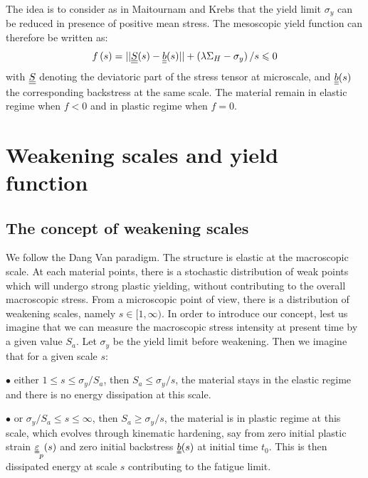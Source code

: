 The idea is to consider as in Maitournam and Krebs\cite{Maitournam2011232} that the yield limit $\sigma_y$ can be reduced in presence of positive mean stress. The mesoscopic yield function can therefore be written as:
\begin{equation}
f\left(s\right)=||\uline{\uline{S}}(s)-\uline{\uline{b}}(s)||+\left( \lambda \Sigma_H-\sigma_y\right) /s\leqslant 0
\label{yieldfun}
\end{equation}
with $\uline{\uline{S}}$ denoting the deviatoric part of the stress tensor at microscale, and $\uline{\uline{b}}(s)$ the corresponding backstress at the same scale. The material remain in elastic regime when $f<0$ and in plastic regime when $f=0$.


\section{Weakening scales and yield function}
\label{sec:5.4}
\subsection{The concept of weakening scales} 

We follow the Dang Van paradigm. The structure is elastic at the macroscopic scale. At each material points, there is a stochastic distribution of weak points which will undergo strong plastic yielding, without contributing to the overall macroscopic stress. From a microscopic point of view, there is a distribution of weakening scales, namely $s\in[1,\infty)$. In order to introduce our concept, lest us imagine that we can measure the macroscopic stress intensity at present time by a given value $S_{a}$. Let $\sigma_y$ be the yield limit before weakening. Then we imagine that for a given scale $s$:

\vspace{6pt}
\noindent
$\bullet$ either $1\leqslant s\leqslant \sigma_y/S_{a}$, then $S_{a}\leqslant \sigma_y/s$, the material stays in the elastic regime and there is no energy dissipation at this scale.

\vspace{6pt}
\noindent
$\bullet$ or $\sigma_y/S_{a}\leqslant s\leqslant \infty$, then $S_{a}\geqslant \sigma_y/s$, the material is in plastic regime at this scale, which evolves through kinematic hardening, say from zero initial plastic strain $\uuline{\varepsilon}_p(s)$ and zero initial backstress $\uuline{b}(s)$ at initial time $t_0$. This is then dissipated energy at scale $s$ contributing to the fatigue limit.


